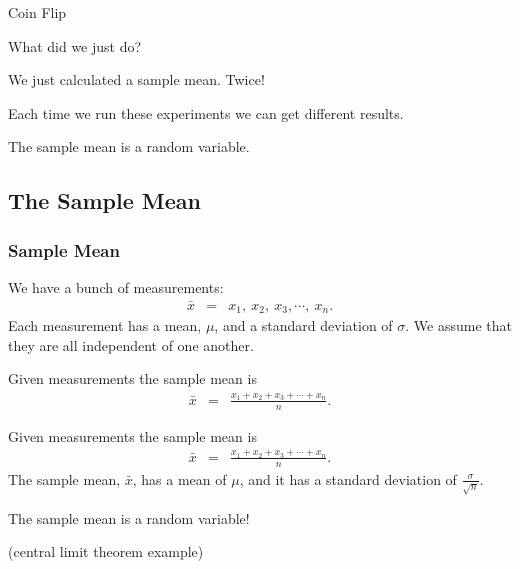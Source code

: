 \begin{frame}{Coin Flip}

What did we just do? 

  {
    We just calculated a sample mean. Twice!
  }

  {
    Each time we run these experiments we can get different results.

    The sample mean is a random variable.
  }
  
\end{frame}

\subsection{The Sample Mean}

\begin{frame}
  \frametitle{Sample Mean}

  We have a bunch of measurements:
  \begin{eqnarray*}
    \bar{x} & = & x_1,~x_2,~x_3,\cdots,~x_n.
  \end{eqnarray*}
  Each measurement has a mean, $\mu$, and a standard deviation of
  $\sigma$. We assume that they are all independent of one another.
  
  {
    \begin{definition}
      Given measurements the sample mean is 
      \begin{eqnarray*}
        \bar{x} & = & \frac{x_1+x_2+x_3+\cdots+x_n}{n}.
      \end{eqnarray*}
    \end{definition}
  }

  {
    \begin{definition}
      Given measurements the sample mean is 
      \begin{eqnarray*}
        \bar{x} & = & \frac{x_1+x_2+x_3+\cdots+x_n}{n}.
      \end{eqnarray*}
      The sample mean, $\bar{x}$,  has a mean of $\mu$, and it has a
      standard deviation of $\frac{\sigma}{\sqrt{n}}$.
    \end{definition}
  }


  {
    The sample mean is a random variable!
  }

\end{frame}


\begin{frame}
  (central limit theorem example)
\end{frame}


